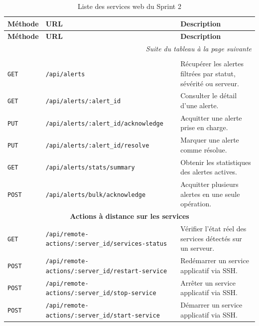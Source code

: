 \renewcommand{\arraystretch}{1.3}
\small
\begin{longtable}{|p{1.6cm}|>{\raggedright\arraybackslash}p{7.4cm}|p{5.4cm}|}
\hline
\textbf{Méthode} & \textbf{URL} & \textbf{Description} \\
\hline
\endfirsthead

\hline
\textbf{Méthode} & \textbf{URL} & \textbf{Description} \\
\hline
\endhead

\hline
\multicolumn{3}{r}{\textit{Suite du tableau à la page suivante}} \\
\endfoot

\hline
\caption{Liste des services web du Sprint 2}
\label{tab:ws-sprint2}
\endlastfoot

\multicolumn{3}{|c|}{\textbf{Gestion des alertes}} \\
\hline
\texttt{GET} & \texttt{/api/alerts} & Récupérer les alertes filtrées par statut, sévérité ou serveur. \\
\hline
\texttt{GET} & \texttt{/api/alerts/:alert\_id} & Consulter le détail d'une alerte. \\
\hline
\texttt{PUT} & \texttt{/api/alerts/:alert\_id/acknowledge} & Acquitter une alerte prise en charge. \\
\hline
\texttt{PUT} & \texttt{/api/alerts/:alert\_id/resolve} & Marquer une alerte comme résolue. \\
\hline
\texttt{GET} & \texttt{/api/alerts/stats/summary} & Obtenir les statistiques des alertes actives. \\
\hline
\texttt{POST} & \texttt{/api/alerts/bulk/acknowledge} & Acquitter plusieurs alertes en une seule opération. \\
\hline

\multicolumn{3}{|c|}{\textbf{Actions à distance sur les services}} \\
\hline
\texttt{GET} & \texttt{/api/remote-actions/}\allowbreak\texttt{:server\_id/}\allowbreak\texttt{services-status} & Vérifier l'état réel des services détectés sur un serveur. \\
\hline
\texttt{POST} & \texttt{/api/remote-actions/}\allowbreak\texttt{:server\_id/}\allowbreak\texttt{restart-service} & Redémarrer un service applicatif via SSH. \\
\hline
\texttt{POST} & \texttt{/api/remote-actions/}\allowbreak\texttt{:server\_id/}\allowbreak\texttt{stop-service} & Arrêter un service applicatif via SSH. \\
\hline
\texttt{POST} & \texttt{/api/remote-actions/}\allowbreak\texttt{:server\_id/}\allowbreak\texttt{start-service} & Démarrer un service applicatif via SSH. \\
\hline


\end{longtable}
